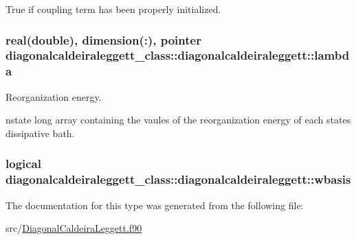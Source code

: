 True if coupling term has been properly initialized. 

\hypertarget{structdiagonalcaldeiraleggett__class_1_1diagonalcaldeiraleggett_a7a47834c87e167dbdc0dae14bff60980}{
\subsubsection[{lambda}]{\setlength{\rightskip}{0pt plus 5cm}real(double), dimension(\+:), pointer diagonalcaldeiraleggett\+\_\+class\+::diagonalcaldeiraleggett\+::lambda\hspace{0.3cm}{\ttfamily [private]}}}\label{structdiagonalcaldeiraleggett__class_1_1diagonalcaldeiraleggett_a7a47834c87e167dbdc0dae14bff60980}


Reorganization energy. 

nstate long array containing the vaules of the reorganization energy of each states dissipative bath. \hypertarget{structdiagonalcaldeiraleggett__class_1_1diagonalcaldeiraleggett_a4e7aa9a04ab3b734534a3ca40ecf0192}{
\subsubsection[{wbasis}]{\setlength{\rightskip}{0pt plus 5cm}logical diagonalcaldeiraleggett\+\_\+class\+::diagonalcaldeiraleggett\+::wbasis\hspace{0.3cm}{\ttfamily [private]}}}\label{structdiagonalcaldeiraleggett__class_1_1diagonalcaldeiraleggett_a4e7aa9a04ab3b734534a3ca40ecf0192}


The documentation for this type was generated from the following file\+:\begin{DoxyCompactItemize}
\item 
src/\hyperlink{_diagonal_caldeira_leggett_8f90}{Diagonal\+Caldeira\+Leggett.\+f90}\end{DoxyCompactItemize}
